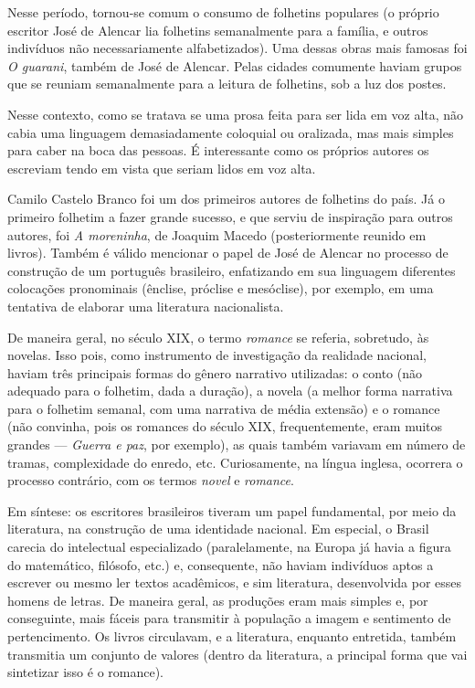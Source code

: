 \documentclass[12pt]{book}
\begin{document}
		\par Nesse período, tornou-se comum o consumo de folhetins populares (o próprio escritor José de Alencar lia folhetins semanalmente para a família, e outros indivíduos não necessariamente alfabetizados). Uma dessas obras mais famosas foi \textit{O guarani}, também de José de Alencar. Pelas cidades comumente haviam grupos que se reuniam semanalmente para a leitura de folhetins, sob a luz dos postes.
		\par Nesse contexto, como se tratava se uma prosa feita para ser lida em voz alta, não cabia uma linguagem demasiadamente coloquial ou oralizada, mas mais simples para caber na boca das pessoas. É interessante como os próprios autores os escreviam tendo em vista que seriam lidos em voz alta.
		\par Camilo Castelo Branco foi um dos primeiros autores de folhetins do país. Já o primeiro folhetim a fazer grande sucesso, e que serviu de inspiração para outros autores, foi \textit{A moreninha}, de Joaquim Macedo (posteriormente reunido em livros). Também é válido mencionar o papel de José de Alencar no processo de construção de um português brasileiro, enfatizando em sua linguagem diferentes colocações pronominais (ênclise, próclise e mesóclise), por exemplo, em uma tentativa de elaborar uma literatura nacionalista.
		\par De maneira geral, no século XIX, o termo \textit{romance} se referia, sobretudo, às novelas. Isso pois, como instrumento de investigação da realidade nacional, haviam três principais formas do gênero narrativo utilizadas: o conto (não adequado para o folhetim, dada a duração), a novela (a melhor forma narrativa para o folhetim semanal, com uma narrativa de média extensão) e o romance (não convinha, pois os romances do século XIX, frequentemente, eram muitos grandes — \textit{Guerra e paz}, por exemplo), as quais também variavam em número de tramas, complexidade do enredo, etc. Curiosamente, na língua inglesa, ocorrera o processo contrário, com os termos \textit{novel} e \textit{romance}.
		\par Em síntese: os escritores brasileiros tiveram um papel fundamental, por meio da literatura, na construção de uma identidade nacional. Em especial, o Brasil carecia do intelectual especializado (paralelamente, na Europa já havia a figura do matemático, filósofo, etc.) e, consequente, não haviam indivíduos aptos a escrever ou mesmo ler textos acadêmicos, e sim literatura, desenvolvida por esses homens de letras. De maneira geral, as produções eram mais simples e, por conseguinte, mais fáceis para transmitir à população a imagem e sentimento de pertencimento. Os livros circulavam, e a literatura, enquanto entretida, também transmitia um conjunto de valores (dentro da literatura, a principal forma que vai sintetizar isso é o romance).
\end{document}
